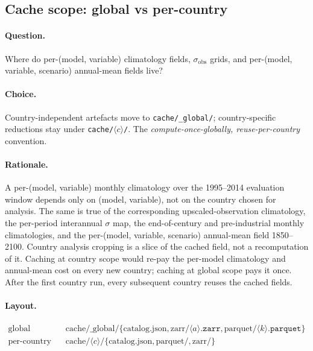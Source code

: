\documentclass[11pt,a4paper]{article}
\begin{document}
\subsection*{Cache scope: global vs per-country}

\paragraph{Question.} Where do per-(model, variable) climatology fields,
$\sigma_\text{obs}$ grids, and per-(model, variable, scenario)
annual-mean fields live?

\paragraph{Choice.} Country-independent artefacts move to
\texttt{cache/\_global/}; country-specific reductions stay under
\texttt{cache/}$\langle c \rangle$\texttt{/}. The \emph{compute-once-globally,
reuse-per-country} convention.

\paragraph{Rationale.} A per-(model, variable) monthly climatology over
the 1995--2014 evaluation window depends only on (model, variable), not
on the country chosen for analysis. The same is true of the corresponding
upscaled-observation climatology, the per-period interannual $\sigma$ map, the
end-of-century and pre-industrial monthly climatologies, and the
per-(model, variable, scenario) annual-mean field 1850--2100. Country
analysis cropping is a slice of the cached field, not a recomputation of
it. Caching at country scope would re-pay the per-model climatology and
annual-mean cost on every new country; caching at global scope pays it
once. After the first country run, every subsequent country reuses the
cached fields.

\paragraph{Layout.}
\begin{align*}
  \text{global} \quad &\text{cache/\_global/}\{ \text{catalog.json},
  \text{zarr/}\langle a \rangle\texttt{.zarr}, \text{parquet/}\langle k \rangle\texttt{.parquet} \} \\
  \text{per-country} \quad &\text{cache/}\langle c \rangle / \{ \text{catalog.json},
  \text{parquet/}, \text{zarr/} \}
\end{align*}
\end{document}
